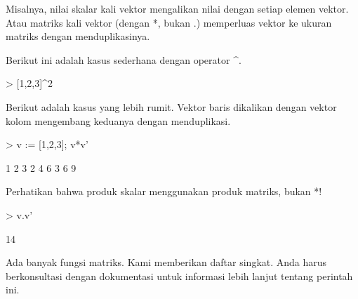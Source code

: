 \documentclass[a4paper,10pt]{article}
\begin{document}
\begin{eulernotebook}
\begin{eulercomment}
\begin{eulercomment}
\begin{eulercomment}
\begin{eulercomment}
\begin{eulercomment}
\begin{eulercomment}
\begin{eulercomment}
Misalnya, nilai skalar kali vektor mengalikan nilai dengan setiap
elemen vektor. Atau matriks kali vektor (dengan *, bukan .) memperluas
vektor ke ukuran matriks dengan menduplikasinya.

Berikut ini adalah kasus sederhana dengan operator \textasciicircum{}.
\end{eulercomment}
\begin{eulerprompt}
> [1,2,3]^2
\end{eulerprompt}
\begin{euleroutput}
  [1,  4,  9]
\end{euleroutput}
\begin{eulercomment}
Berikut adalah kasus yang lebih rumit. Vektor baris dikalikan dengan
vektor kolom mengembang keduanya dengan menduplikasi.
\end{eulercomment}
\begin{eulerprompt}
> v := [1,2,3]; v*v'
\end{eulerprompt}
\begin{euleroutput}
              1             2             3 
              2             4             6 
              3             6             9 
\end{euleroutput}
\begin{eulercomment}
Perhatikan bahwa produk skalar menggunakan produk matriks, bukan *!
\end{eulercomment}
\begin{eulerprompt}
> v.v'
\end{eulerprompt}
\begin{euleroutput}
  14
\end{euleroutput}
\begin{eulercomment}
Ada banyak fungsi matriks. Kami memberikan daftar singkat. Anda harus
berkonsultasi dengan dokumentasi untuk informasi lebih lanjut tentang
perintah ini.


\end{eulercomment}
\end{eulercomment}
\end{eulercomment}
\end{eulercomment}
\end{eulercomment}
\end{eulercomment}
\end{eulercomment}
\end{eulernotebook}
\end{document}
